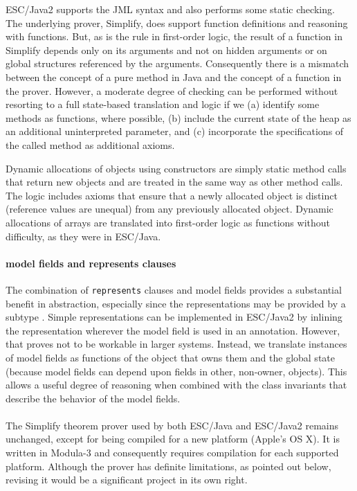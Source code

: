 \documentclass{llncs}
\begin{document}
ESC/Java2 supports the JML syntax and also performs some static
checking.  The underlying prover, Simplify, does support function
definitions and reasoning with functions.  But, as is the rule in
first-order logic, the result of a function in Simplify depends only
on its arguments and not on hidden arguments or on global structures
referenced by the arguments.  Consequently there is a mismatch between
the concept of a pure method in Java and the concept of a function in
the prover.  However, a moderate degree of checking can be performed
without resorting to a full state-based translation and logic if we
(a) identify some methods as functions, where possible, (b) include
the current state of the heap as an additional uninterpreted
parameter, and (c) incorporate the specifications of the called method
as additional axioms.

Dynamic allocations of objects using constructors are simply static
method calls that return new objects and are treated in the same way
as other method calls.  The logic includes axioms that ensure that a
newly allocated object is distinct (reference values are unequal) from
any previously allocated object.  Dynamic allocations of arrays are
translated into first-order logic as functions without difficulty, as
they were in ESC/Java.

\paragraph*{model fields and represents clauses}
The combination of \texttt{represents} clauses and model fields
provides a substantial benefit in abstraction, especially since the
representations may be provided by a subtype \cite{Cheon-etal03}.
Simple representations can be implemented in ESC/Java2 by inlining the
representation wherever the model field is used in an annotation.
However, that proves not to be workable in larger systems.  Instead,
we translate instances of model fields as functions of the object that
owns them and the global state (because model fields can depend upon fields
in other, non-owner, objects).  This allows a useful degree of
reasoning when combined with the class invariants that describe the
behavior of the model fields.

\paragraph*{} The Simplify theorem prover used by both ESC/Java and
ESC/Java2 remains unchanged, except for being compiled for a new
platform (Apple's OS X).  It is written in Modula-3 and consequently
requires compilation for each supported platform.  Although the prover
has definite limitations, as pointed out below, revising it would be a
significant project in its own right.
\end{document}
